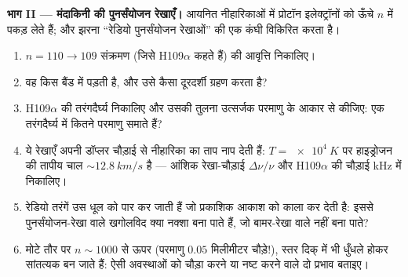 \begin{problem}
\medskip\noindent\textbf{भाग II --- मंदाकिनी की पुनर्संयोजन
रेखाएँ।}
आयनित नीहारिकाओं में प्रोटॉन इलेक्ट्रॉनों को ऊँचे $n$ में पकड़ लेते हैं;
और झरना ``रेडियो पुनर्संयोजन रेखाओं'' की एक कंघी विकिरित करता है।
\begin{enumerate}[resume]
  \item $n = 110 \to 109$ संक्रमण (जिसे H109$\alpha$ कहते हैं) की
        आवृत्ति निकालिए।
  \item वह किस बैंड में पड़ती है, और उसे कैसा दूरदर्शी ग्रहण करता
        है?
  \item H109$\alpha$ की तरंगदैर्घ्य निकालिए और उसकी तुलना
        उत्सर्जक परमाणु के आकार से कीजिए: एक तरंगदैर्घ्य में कितने
        परमाणु समाते हैं?
  \item ये रेखाएँ अपनी डॉप्लर चौड़ाई से नीहारिका का ताप नाप देती हैं:
        $T = \qty{e4}{K}$ पर हाइड्रोजन की तापीय
        चाल $\sim\qty{12.8}{km/s}$ है --- आंशिक
        रेखा-चौड़ाई $\Delta\nu/\nu$ और H109$\alpha$ की चौड़ाई
        kHz में निकालिए।
  \item रेडियो तरंगें उस धूल को पार कर जाती हैं जो प्रकाशिक आकाश को
        काला कर देती है: इससे पुनर्संयोजन-रेखा वाले खगोलविद क्या
        नक्शा बना पाते हैं, जो बामर-रेखा वाले नहीं बना पाते?
  \item मोटे तौर पर $n \sim 1000$ से ऊपर (परमाणु $0.05$ मिलीमीटर
        चौड़े!), स्तर दिक् में भी धुँधले होकर सांतत्यक बन जाते हैं:
        ऐसी अवस्थाओं को चौड़ा करने या नष्ट करने वाले दो प्रभाव बताइए।
\end{enumerate}


\end{problem}
